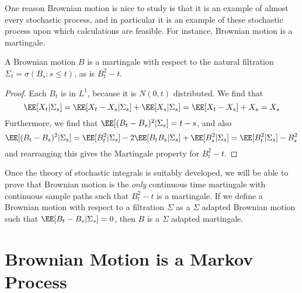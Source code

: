 One reason Brownian motion is nice to study is that it is an example of almost every stochastic process, and in particular it is an example of these stochastic process upon which calculations are feasible. For instance, Brownian motion is a martingale.

\begin{theorem}
    A Brownian motion $B$ is a martingale with respect to the natural filtration $\Sigma_t = \sigma(B_s: s \leq t)$, as is $B_t^2 - t$.
\end{theorem}
\begin{proof}
    Each $B_t$ is in $L^1$, because it is $N(0,t)$ distributed.  We find that
    \[ \EE[X_t | \Sigma_s] = \EE[X_t - X_s | \Sigma_s] + \EE[X_s|\Sigma_s] = \EE[X_t - X_s] + X_s = X_s \]
    Furthermore, we find that $\EE[(B_t - B_s)^2|\Sigma_s] = t-s$, and also
    \[ \EE[(B_t - B_s)^2 | \Sigma_s] = \EE[B_t^2|\Sigma_s] - 2\EE[B_tB_s|\Sigma_s] + \EE[B_s^2|\Sigma_s] = \EE[B_t^2|\Sigma_s] - B_s^2 \]
    and rearranging this gives the Martingale property for $B_t^2 - t$.
\end{proof}

Once the theory of stochastic integrals is suitably developed, we will be able to prove that Brownian motion is the {\it only} continuous time martingale with continuous sample paths such that $B_t^2 - t$ is a martingale. If we define a Brownian motion with respect to a filtration $\Sigma$ as a $\Sigma$ adapted Brownian motion such that $\EE[B_t - B_s|\Sigma_s] = 0$, then $B$ is a $\Sigma$ adapted martingale.

\section{Brownian Motion is a Markov Process}


